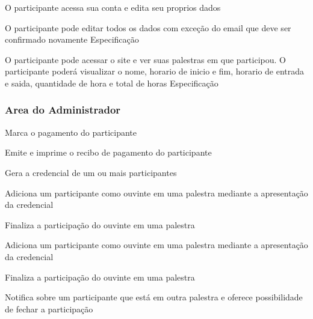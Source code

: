 \documentclass[12pt,a4paper]{article}
\begin{document}
				{O participante acessa sua conta e edita seu proprios dados}
				{%
					  {O participante pode editar todos os dados com exceção do email que deve ser confirmado novamente}
					  {Especificação}{}{}%
				
				}
				
				{O participante pode acessar o site e ver suas palestras em que participou.}
				{%
						{O participante poderá visualizar o nome, horario de inicio e fim, horario de entrada e saida, quantidade de hora e total de horas}
						{Especificação}{}{}%
				}
			
				\clearpage
				\subsubsection{Area do Administrador}
				
				{Marca o pagamento do participante}
				{%
				
				}
				
				{Emite e imprime o recibo de pagamento do participante}
				{%
				
				}
				
				{Gera a credencial de um ou mais participantes}
				{%
				
				}
				
				{Adiciona um participante como ouvinte em uma palestra mediante a apresentação da credencial}
				{%
				
				}
				{Finaliza a participação do ouvinte em uma palestra}
				{%
				
				}
				
				{Adiciona um participante como ouvinte em uma palestra mediante a apresentação da credencial}
				{%
				
				}
				
				{Finaliza a participação do ouvinte em uma palestra}
				{%
				
				}
				
				{Notifica sobre um participante que está em outra palestra e oferece possibilidade de fechar a participação}
				{%
				
				}
				
\end{document}
